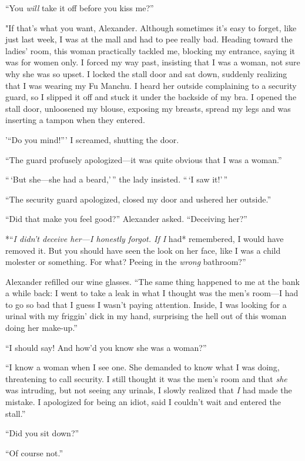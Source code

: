 ``You \emph{will} take it off before you kiss me?''

"If that's what you want, Alexander. Although sometimes it's easy to
forget, like just last week, I was at the mall and had to pee really
bad. Heading toward the ladies' room, this woman practically tackled me,
blocking my entrance, saying it was for women only. I forced my way
past, insisting that I was a woman, not sure why she was so upset. I
locked the stall door and sat down, suddenly realizing that I was
wearing my Fu Manchu. I heard her outside complaining to a security
guard, so I slipped it off and stuck it under the backside of my bra. I
opened the stall door, unloosened my blouse, exposing my breasts, spread
my legs and was inserting a tampon when they entered.

'``Do you mind!''' I screamed, shutting the door.

``The guard profusely apologized---it was quite obvious that I was a
woman.''

``\,`But she---she had a beard,'\,'' the lady insisted. ``\,`I saw
it!'\,''

``The security guard apologized, closed my door and ushered her
outside.''

``Did that make you feel good?'' Alexander asked. ``Deceiving her?''

*``\emph{I didn't deceive her---I honestly forgot. If I }had*
remembered, I would have removed it. But you should have seen the look
on her face, like I was a child molester or something. For what? Peeing
in the \emph{wrong} bathroom?''

Alexander refilled our wine glasses. ``The same thing happened to me at
the bank a while back: I went to take a leak in what I thought was the
men's room---I had to go so bad that I guess I wasn't paying attention.
Inside, I was looking for a urinal with my friggin' dick in my hand,
surprising the hell out of this woman doing her make-up.''

``I should say! And how'd you know she was a woman?''

``I know a woman when I see one. She demanded to know what I was doing,
threatening to call security. I still thought it was the men's room and
that \emph{she} was intruding, but not seeing any urinals, I slowly
realized that \emph{I} had made the mistake. I apologized for being an
idiot, said I couldn't wait and entered the stall.''

``Did you sit down?''

``Of course not.''

